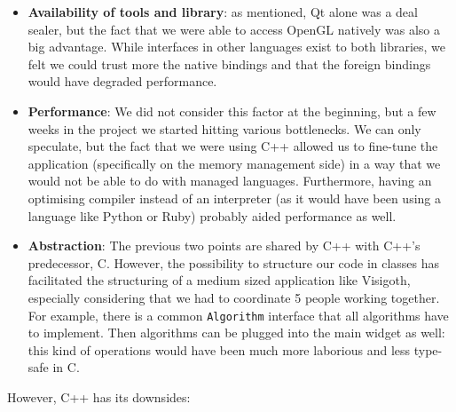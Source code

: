 \documentclass[a4paper,11pt,titlepage]{article}
\newcommand{\code}[1]{\texttt{#1}}
\begin{document}
\begin{itemize}

\item
  \textbf{Availability of tools and library}: as mentioned, Qt alone was a deal
  sealer, but the fact that we were able to access OpenGL natively was also a
  big advantage. While interfaces in other languages exist to both libraries, we
  felt we could trust more the native bindings and that the foreign bindings
  would have degraded performance.

\item
  \textbf{Performance}: We did not consider this factor at the beginning, but a
  few weeks in the project we started hitting various bottlenecks. We can only
  speculate, but the fact that we were using C++ allowed us to fine-tune the
  application (specifically on the memory management side) in a way that we
  would not be able to do with managed languages. Furthermore, having an
  optimising compiler instead of an interpreter (as it would have been using a
  language like Python or Ruby) probably aided performance as well.

\item
  \textbf{Abstraction}: The previous two points are shared by C++ with C++'s
  predecessor, C. However, the possibility to structure our code in classes has
  facilitated the structuring of a medium sized application like Visigoth,
  especially considering that we had to coordinate 5 people working
  together. For example, there is a common \code{Algorithm} interface that all
  algorithms have to implement. Then algorithms can be plugged into the main
  widget as well: this kind of operations would have been much more laborious
  and less type-safe in C.

\end{itemize}

However, C++ has its downsides:
\end{document}
